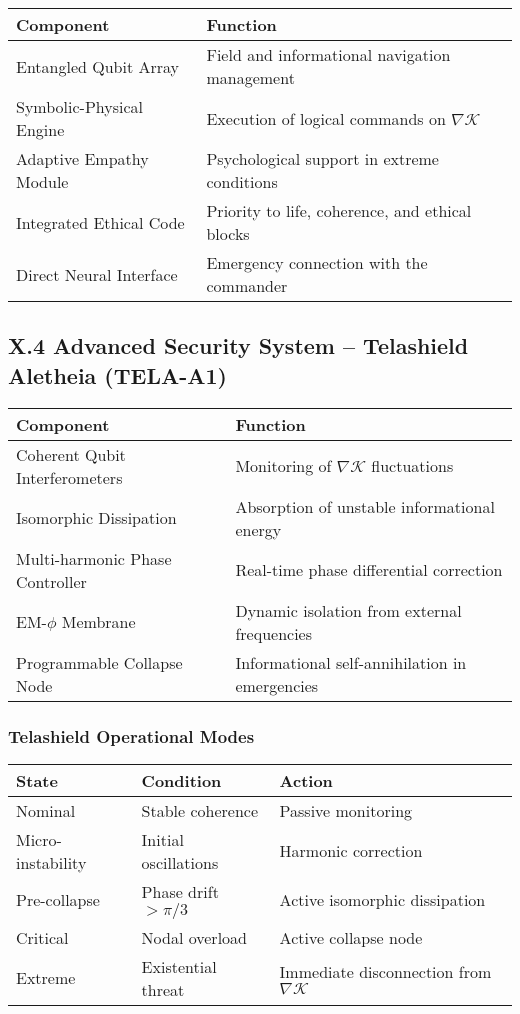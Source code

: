 \documentclass[12pt]{article}
\begin{document}
\begin{tabular}{ll}
\toprule
\textbf{Component} & \textbf{Function} \\
\midrule
Entangled Qubit Array & Field and informational navigation management \\
Symbolic-Physical Engine & Execution of logical commands on $\nabla \mathcal{K}$ \\
Adaptive Empathy Module & Psychological support in extreme conditions \\
Integrated Ethical Code & Priority to life, coherence, and ethical blocks \\
Direct Neural Interface & Emergency connection with the commander \\
\bottomrule
\end{tabular}

\vspace{0.6cm}

\subsection*{X.4 Advanced Security System – Telashield Aletheia (TELA-A1)}

\begin{tabular}{ll}
\toprule
\textbf{Component} & \textbf{Function} \\
\midrule
Coherent Qubit Interferometers & Monitoring of $\nabla \mathcal{K}$ fluctuations \\
Isomorphic Dissipation & Absorption of unstable informational energy \\
Multi-harmonic Phase Controller & Real-time phase differential correction \\
EM-$\phi$ Membrane & Dynamic isolation from external frequencies \\
Programmable Collapse Node & Informational self-annihilation in emergencies \\
\bottomrule
\end{tabular}

\vspace{0.4cm}
\subsubsection*{Telashield Operational Modes}
\begin{tabular}{lll}
\toprule
\textbf{State} & \textbf{Condition} & \textbf{Action} \\
\midrule
Nominal & Stable coherence & Passive monitoring \\
Micro-instability & Initial oscillations & Harmonic correction \\
Pre-collapse & Phase drift $> \pi/3$ & Active isomorphic dissipation \\
Critical & Nodal overload & Active collapse node \\
Extreme & Existential threat & Immediate disconnection from $\nabla \mathcal{K}$ \\
\bottomrule
\end{tabular}
\end{document}
